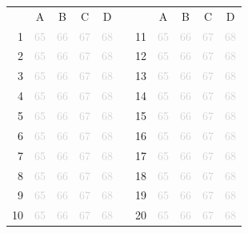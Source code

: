\documentclass[a4paper,11pt]{article}
\newcommand{\light}[1]{\textcolor{lightgray}{#1}}
\begin{document}
\begin{center}
\large
\begin{tabular}{r|c|c|c|c|p{0.3cm}r|c|c|c|c|}
\multicolumn{1}{c}{} &
\multicolumn{1}{c}{A}&
\multicolumn{1}{c}{B}&
\multicolumn{1}{c}{C}&
\multicolumn{1}{c}{D}& \multicolumn{2}{c}{} &
\multicolumn{1}{c}{A}&
\multicolumn{1}{c}{B}&
\multicolumn{1}{c}{C}&
\multicolumn{1}{c}{D}\\ 
\cline{2-5} \cline{8-11}
1& \light{65} & \light{66} & \light{67} & \light{68} & & 11& \light{65} & \light{66} & \light{67} & \light{68} \\ 
\cline{2-5} \cline{8-11}
2& \light{65} & \light{66} & \light{67} & \light{68} & & 12& \light{65} & \light{66} & \light{67} & \light{68} \\ 
\cline{2-5} \cline{8-11}
3& \light{65} & \light{66} & \light{67} & \light{68} & & 13& \light{65} & \light{66} & \light{67} & \light{68} \\ 
\cline{2-5} \cline{8-11}
4& \light{65} & \light{66} & \light{67} & \light{68} & & 14& \light{65} & \light{66} & \light{67} & \light{68} \\ 
\cline{2-5} \cline{8-11}
5& \light{65} & \light{66} & \light{67} & \light{68} & & 15& \light{65} & \light{66} & \light{67} & \light{68} \\ 
\cline{2-5} \cline{8-11}
6& \light{65} & \light{66} & \light{67} & \light{68} & & 16& \light{65} & \light{66} & \light{67} & \light{68} \\ 
\cline{2-5} \cline{8-11}
7& \light{65} & \light{66} & \light{67} & \light{68} & & 17& \light{65} & \light{66} & \light{67} & \light{68} \\ 
\cline{2-5} \cline{8-11}
8& \light{65} & \light{66} & \light{67} & \light{68} & & 18& \light{65} & \light{66} & \light{67} & \light{68} \\ 
\cline{2-5} \cline{8-11}
9& \light{65} & \light{66} & \light{67} & \light{68} & & 19& \light{65} & \light{66} & \light{67} & \light{68} \\ 
\cline{2-5} \cline{8-11}
10& \light{65} & \light{66} & \light{67} & \light{68} & & 20& \light{65} & \light{66} & \light{67} & \light{68} \\ 
\cline{2-5} \cline{8-11}
\end{tabular}
\end{center}
\end{document}
